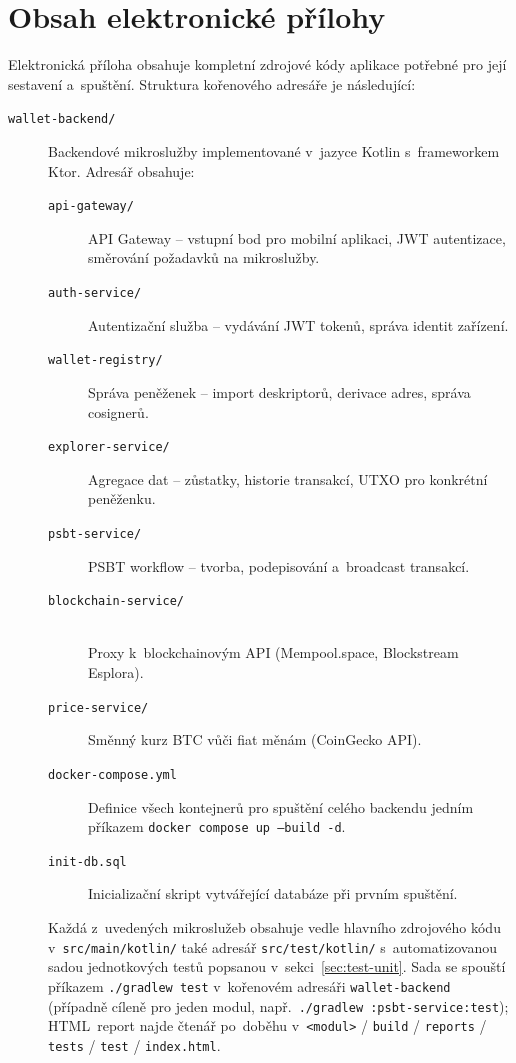 
\appendix
\chapter{Obsah elektronické přílohy}
\label{app:struktura}

Elektronická příloha obsahuje kompletní zdrojové kódy aplikace potřebné
pro její sestavení a~spuštění. Struktura kořenového adresáře je následující:

\bigskip
\begin{description}
\item[\texttt{wallet-backend/}] Backendové mikroslužby implementované
  v~jazyce Kotlin s~frameworkem Ktor. Adresář obsahuje:

  \begin{description}
  \item[\texttt{api-gateway/}] API Gateway -- vstupní bod pro mobilní
    aplikaci, JWT autentizace, směrování požadavků na mikroslužby.
  \item[\texttt{auth-service/}] Autentizační služba -- vydávání JWT
    tokenů, správa identit zařízení.
  \item[\texttt{wallet-registry/}] Správa peněženek -- import deskriptorů,
    derivace adres, správa cosignerů.
  \item[\texttt{explorer-service/}] Agregace dat -- zůstatky, historie
    transakcí, UTXO pro konkrétní peněženku.
  \item[\texttt{psbt-service/}] PSBT workflow -- tvorba, podepisování
    a~broadcast transakcí.
  \item[\texttt{blockchain-service/}] \hfill \\
    Proxy k~blockchainovým API (Mempool.space, Blockstream Esplora).
  \item[\texttt{price-service/}] Směnný kurz BTC vůči fiat měnám
    (CoinGecko API).
  \item[\texttt{docker-compose.yml}] Definice všech kontejnerů pro
    spuštění celého backendu jedním příkazem
    \texttt{docker compose up --build -d}.
  \item[\texttt{init-db.sql}] Inicializační skript vytvářející databáze
    při prvním spuštění.
  \end{description}

  Každá z~uvedených mikroslužeb obsahuje vedle hlavního zdrojového kódu
  v~\texttt{src/main/kotlin/} také adresář \texttt{src/test/kotlin/}
  s~automatizovanou sadou jednotkových testů popsanou
  v~sekci~\ref{sec:test-unit}. Sada se spouští příkazem
  \texttt{./gradlew test} v~kořenovém adresáři \texttt{wallet-backend}
  (případně cíleně pro jeden modul, např.\
  \texttt{./gradlew :psbt-service:test}); HTML~report najde čtenář
  po~doběhu v~\texttt{<modul>} / \texttt{build} / \texttt{reports} /
  \texttt{tests} / \texttt{test} / \texttt{index.html}.


\end{description}
